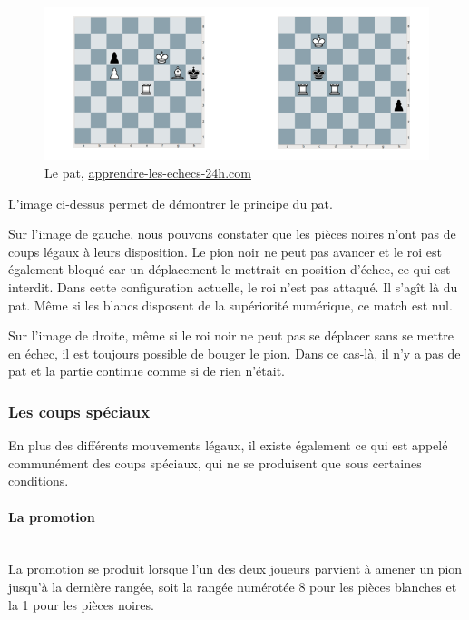 \huge\documentclass{article}
\begin{document}
\begin{figure}[h]
\centering
\includegraphics[scale=1]{img/pat.png}
\caption{Le pat,  \href{https://www.apprendre-les-echecs-24h.com/blog/debuter-aux-echecs/le-pat/}{ apprendre-les-echecs-24h.com}}
\end{figure}

L'image ci-dessus permet de démontrer le principe du pat.

Sur l'image de gauche, nous pouvons constater que les pièces noires n'ont pas de coups légaux à leurs disposition. Le pion noir ne peut pas avancer et le roi est également bloqué car un déplacement le mettrait en position d'échec, ce qui est interdit. Dans cette configuration actuelle, le roi n'est pas attaqué. Il s'agît là du pat. Même si les blancs disposent de la supériorité numérique, ce match est nul.

Sur l'image de droite, même si le roi noir ne peut pas se déplacer sans se mettre en échec, il est toujours possible de bouger le pion. Dans ce cas-là, il n'y a pas de pat et la partie continue comme si de rien n'était.

\subsubsection{Les coups spéciaux}

En plus des différents mouvements légaux, il existe également ce qui est appelé communément des coups spéciaux, qui ne se produisent que sous certaines conditions.

\paragraph{La promotion}\label{Promotion}
~~\\

La promotion se produit lorsque l'un des deux joueurs parvient à amener un pion jusqu'à la dernière rangée, soit la rangée numérotée 8 pour les pièces blanches et la 1 pour les pièces noires.
\end{document}
